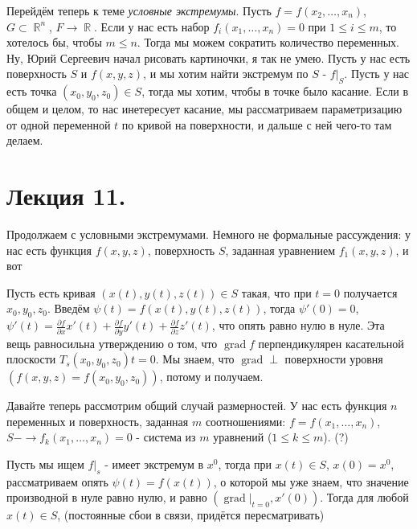 \documentclass[a4paper,100pt]{article}
\theoremstyle{indented}
\theoremstyle{definition}
\theoremstyle{remark}
\DeclareMathOperator{\RR}{\mathbb{R}}
\DeclareMathOperator{\grad}{grad}
\begin{document}
Перейдём теперь к теме \textit{условные экстремумы}. Пусть $f=f(x_2, \ldots, x_n)$, $G\subset \RR^n$, $F\rightarrow \RR$. Если у нас есть набор $f_i(x_1, \ldots, x_n)=0$ при $1\leq i\leq m$, то хотелось бы, чтобы $m\leq n$. Тогда мы можем сократить количество переменных. Ну, Юрий Сергеевич начал рисовать картиночки, я так не умею. Пусть у нас есть поверхность $S$ и $f(x,y,z)$, и мы хотим найти экстремум по $S$ - $f|_S$. Пусть у нас есть точка $(x_0, y_0, z_0)\in S$, тогда мы хотим, чтобы в точке было касание. Если в общем и целом, то нас инетересует касание, мы рассматриваем параметризацию от одной переменной $t$ по кривой на поверхности, и дальше с ней чего-то там делаем.

\section{Лекция 11.}

Продолжаем с условными экстремумами. Немного не формальные рассуждения: у нас есть функция $f(x, y, z)$, поверхность $S$, заданная уравнением $f_1(x, y, z)$, и вот

Пусть есть кривая $(x(t), y(t), z(t))\in S$ такая, что при $t=0$ получается $x_0, y_0, z_0$. Введём $\psi(t)=f(x(t), y(t), z(t))$, тогда $\psi'(0)=0$, $\psi'(t)=\frac{\partial f}{\partial x}x'(t)+\frac{\partial f}{\partial y}y'(t)+\frac{\partial f}{\partial z}z'(t)$, что опять равно нулю в нуле. Эта вещь равносильна утверждению о том, что $\grad f$ перпендикулярен касательной плоскости $T_s(x_0, y_0, z_0)t=0$. Мы знаем, что $\grad \perp$ поверхности уровня $(f(x, y, z)=f(x_0, y_0, z_0))$, потому и получаем. 

Давайте теперь рассмотрим общий случай размерностей. У нас есть функция $n$ переменных и поверхность, заданная $m$ соотношениями: $f=f(x_1, \ldots, x_n)$, $S - \rightarrow f_k(x_1, \ldots, x_n)=0$ - система из $m$ уравнений ($1\leq k\leq m$). (?) \ 

Пусть мы ищем $f|_s$ - имеет экстремум в $x^0$, тогда при $x(t)\in S$, $x(0)=x^0$, рассматриваем опять $\psi(t)=f(x(t))$, о которой мы уже знаем, что значение производной в нуле равно нулю, и равно $(\grad|_{t=0}, x'(0))$. Тогда для любой $x(t)\in S$, (постоянные сбои в связи, придётся пересматривать)

\newpage
\end{document}
